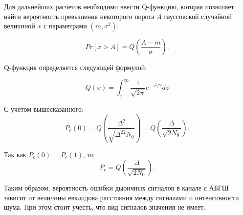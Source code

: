 Для дальнейших расчетов необходимо ввести Q-функцию, которая позволяет найти вероятность превышения некоторого порога $A$ гауссовской случайной величиной $x$ с параметрами $(m,\sigma^2)$:

\begin{equation}
	Pr[x > A] = Q(\frac{A - m}{\sigma}).
\end{equation}

Q-функция определяется следующей формулой:

\begin{equation}
	Q(x) = \int_{x}^{\infty}{\frac{1}{\sqrt{2\pi}}}e^{-z^2 / 2}dz
\end{equation} 

С учетом вышесказанного:
\begin{equation}
	P_e(0) = Q(\frac{\Delta^2}{\sqrt{\Delta^22N_0}}) = Q(\frac{\Delta}{\sqrt{2N_0}}).
\end{equation}

Так как $P_e(0)$ = $P_e(1)$, то
\begin{equation}
	P_e = Q(\frac{\Delta}{\sqrt{2N_0}}).
\end{equation}

Таким образом, вероятность ошибки дыоичных сигналов в канале с АБГШ зависит от величины евклидова расстояния между сигналами и интенсивности шума. При этом стоит учесть, что вид сигналов значения не имеет.

\newpage